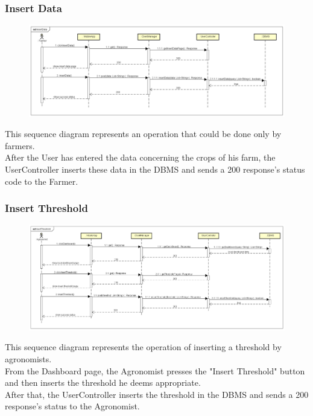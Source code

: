 \newpage
\subsubsection{Insert Data}

\begin{figure}[H]
    \begin{center}
        \includegraphics[width=\textwidth]{Images/SequenceDiagrams/InsertDataDD.png}
    \end{center}
\end{figure}

This sequence diagram represents an operation that could be done only by farmers.\\
After the User has entered the data concerning the crops of his farm, the UserController 
inserts these data in the DBMS and sends a 200 response's status code to the Farmer.


\bigskip
\subsubsection{Insert Threshold}

\begin{figure}[H]
    \begin{center}
        \includegraphics[width=\textwidth]{Images/SequenceDiagrams/InsertThresholdDD.png}
    \end{center}
\end{figure}

This sequence diagram represents the operation of inserting a threshold by agronomists.\\
From the Dashboard page, the Agronomist presses the "Insert Threshold" button and then inserts the threshold he deems appropriate.\\
After that, the UserController inserts the threshold in the DBMS and sends a 200 response's status to the Agronomist.


